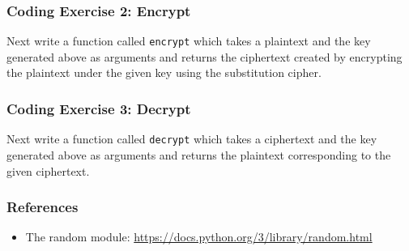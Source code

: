 \documentclass{beamer}
\newcommand{\<}{\langle}
\renewcommand{\>}{\rangle}
\begin{document}
\begin{frame}[fragile]
\frametitle{Coding Exercise 2: Encrypt}

Next write a function called \verb|encrypt| which takes a plaintext and the key generated above as arguments and returns the ciphertext created by encrypting the plaintext under the given key using the substitution cipher. 
\end{frame}


\begin{frame}[fragile]
\frametitle{Coding Exercise 3: Decrypt}

Next write a function called \verb|decrypt| which takes a ciphertext and the key generated above as arguments and returns the plaintext corresponding to the given ciphertext.
\end{frame}


\begin{frame}
\frametitle{References}

\begin{itemize}
\item The random module: \url{https://docs.python.org/3/library/random.html}
\end{itemize}
\end{frame}
\end{document}
